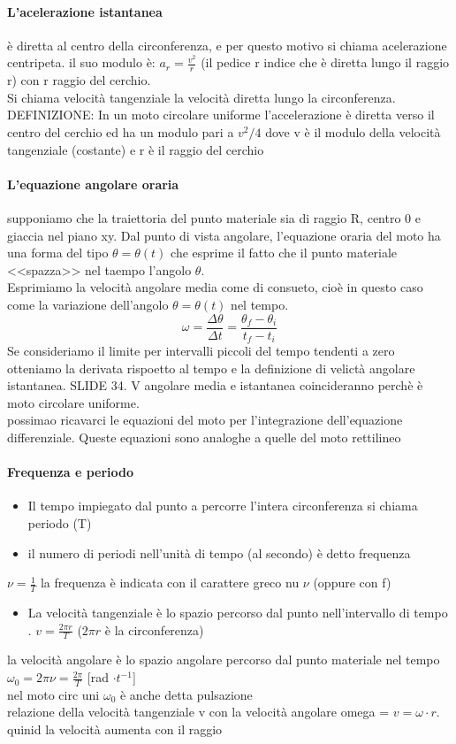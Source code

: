 \documentclass[12pt, a4paper, openany]{book}
\begin{document}
\paragraph*{L'acelerazione istantanea} è diretta al centro della circonferenza, e per questo motivo si chiama acelerazione centripeta. il suo modulo è: $a_r = \frac{v^2}{r}$ (il pedice r indice che è diretta lungo il raggio r) con r raggio del cerchio.
\\Si chiama velocità tangenziale la velocità diretta lungo la circonferenza.
\\DEFINIZIONE: In un moto circolare uniforme l'accelerazione è diretta verso il centro del cerchio ed ha un modulo pari a $v^2/4$ dove v è il modulo della velocità tangenziale (costante) e r è il raggio del cerchio
\paragraph*{L'equazione angolare oraria} supponiamo che la traiettoria del punto materiale sia di raggio R, centro 0 e giaccia nel piano xy.
Dal punto di vista angolare, l'equazione oraria del moto ha una forma del tipo $\theta = \theta(t)$ che esprime il fatto che il punto materiale <<spazza>> nel taempo l'angolo $\theta$.
\\Esprimiamo la velocità angolare media come di consueto, cioè in questo caso come la variazione dell'angolo $\theta = \theta(t)$ nel tempo.
$$\omega = \frac{\Delta \theta}{\Delta t} = \frac{\theta_f - \theta_i}{t_f - t_i}$$
Se consideriamo il limite per intervalli piccoli del tempo tendenti a zero otteniamo la derivata rispoetto al tempo e la definizione di velictà angolare istantanea. SLIDE 34.
V angolare media e istantanea coincideranno perchè è moto circolare uniforme.
\\possimao ricavarci le equazioni del moto per l'integrazione dell'equazione differenziale. Queste equazioni sono analoghe a quelle del moto rettilineo
\paragraph*{Frequenza e periodo} \begin{itemize}
    \item Il tempo impiegato dal punto a percorre l'intera circonferenza si chiama periodo (T)
    \item il numero di periodi nell'unità di tempo (al secondo) è detto frequenza
\end{itemize}
$\nu = \frac{1}{T}$ la frequenza è indicata con il carattere greco nu $\nu$ (oppure con f)
\begin{itemize}
    \item La velocità tangenziale è lo spazio percorso dal punto nell'intervallo di tempo . $v= \frac{2\pi r}{T}$ ($2\pi r$ è la circonferenza)
\end{itemize}
la velocità angolare è lo spazio angolare percorso dal punto materiale nel tempo $ \omega_0 = 2 \pi \nu = \frac{2 \pi }{T}$ [rad $\cdot t^{-1}$]
\\nel moto circ uni $\omega_0$ è anche detta pulsazione 
\\relazione della velocità tangenziale v con la velocità angolare omega = $v = \omega \cdot r$. quinid la velocità aumenta con il raggio 
\end{document}
